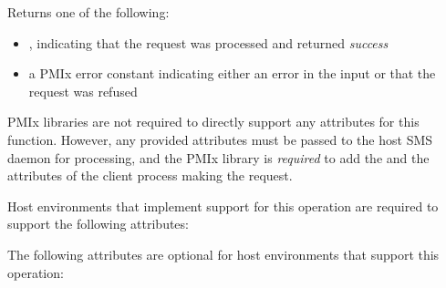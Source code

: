 \begin{arglist}
\end{arglist}

Returns one of the following:

\begin{itemize}
    \item {}, indicating that the request was processed and returned \textit{success}
    \item a PMIx error constant indicating either an error in the input or that the request was refused
\end{itemize}

\reqattrstart
\ac{PMIx} libraries are not required to directly support any attributes for this function. However, any provided attributes must be passed to the host \ac{SMS} daemon for processing, and the \ac{PMIx} library is \textit{required} to add the  and the  attributes of the client process making the request.

\divider

Host environments that implement support for this operation are required to support the following attributes:


\reqattrend

\optattrstart
The following attributes are optional for host environments that support this operation:


\optattrend

\descr

